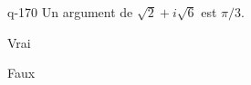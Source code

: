 \begin{truefalse}{q-170}
Un argument de $\sqrt 2 + i \sqrt 6$ est $\pi/3$.
\item* Vrai
\item Faux
\end{truefalse}

